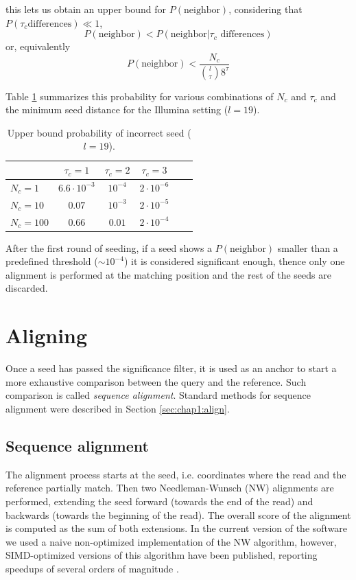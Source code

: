 this lets us obtain an upper bound for $P(\mbox{neighbor})$,
considering that $P(\tau_c\mbox{differences}) \ll 1$,
\begin{equation}
  P(\mbox{neighbor}) < P(\mbox{neighbor}|\tau_c\mbox{ differences})
\end{equation}
or, equivalently
\begin{equation}
  P(\mbox{neighbor}) < \frac{N_c}{{{l}\choose{\tau}}8^{\tau}}
\end{equation}

Table \ref{tab:chap3:prob_seed} summarizes this probability for
various combinations of $N_c$ and $\tau_c$ and the minimum seed
distance for the Illumina setting ($l=19$).

\begin{table}[h]
\centering
\caption{Upper bound probability of incorrect seed ($l=19$).}
\begin{tabular}{|l|c|c|c|c|c|}
	\hline
    & $\tau_c=1$ & $\tau_c=2$ & $\tau_c=3$ \\
   \hline
   $N_c=1$ & $6.6\cdot10^{-3}$ & $10^{-4}$ & $2\cdot10^{-6}$
   \\ \hline
   $N_c=10$ & $0.07$ & $10^{-3}$ & $2\cdot10^{-5}$
   \\ \hline
   $N_c=100$ & $0.66$ & $0.01$ & $2\cdot10^{-4}$ \\ \hline
\end{tabular}
\label{tab:chap3:prob_seed}
\end{table}
After the first round of seeding, if a seed shows a
$P(\mbox{neighbor})$ smaller than a predefined threshold
($\sim10^{-4}$) it is considered significant enough, thence only one
alignment is performed at the matching position and the rest of the
seeds are discarded.

\section{Aligning}
Once a seed has passed the significance filter, it is used as an
anchor to start a more exhaustive comparison between the query and the
reference. Such comparison is called {\em sequence
 alignment}. Standard methods for sequence alignment were described 
in Section \ref{sec:chap1:align}.

\subsection{Sequence alignment}
The alignment process starts at the seed, i.e. coordinates where the
read and the reference partially match. Then two Needleman-Wunsch (NW)
alignments are performed, extending the seed forward (towards the end
of the read) and backwards (towards the beginning of the read). The
overall score of the alignment is computed as the sum of both
extensions. In the current version of the software we used a naive
non-optimized implementation of the NW algorithm, however, SIMD-optimized
versions of this algorithm have been published, reporting speedups of
several orders of magnitude \cite{}.

